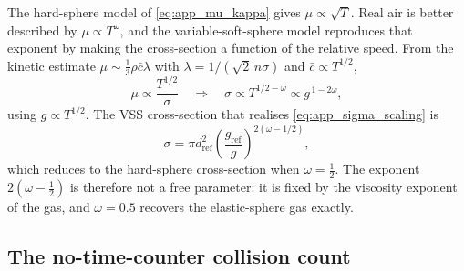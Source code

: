 The hard-sphere model of \eqref{eq:app_mu_kappa} gives $\mu\propto\sqrt{T}$. Real air is better described by $\mu\propto T^{\omega}$, and the variable-soft-sphere model reproduces that exponent by making the cross-section a function of the relative speed. From the kinetic estimate $\mu \sim \tfrac13\rho\bar{c}\lambda$ with $\lambda = 1/(\sqrt2\,n\sigma)$ and $\bar{c}\propto T^{1/2}$,
\begin{equation}
    \mu \propto \frac{T^{1/2}}{\sigma}
    \quad\Longrightarrow\quad
    \sigma \propto T^{1/2-\omega} \propto g^{\,1-2\omega} ,
    \label{eq:app_sigma_scaling}
\end{equation}
using $g \propto T^{1/2}$. The VSS cross-section that realises \eqref{eq:app_sigma_scaling} is~\cite{bird1981vss}
\begin{equation}
    \sigma = \pi d_{\mathrm{ref}}^2\left(\frac{g_{\mathrm{ref}}}{g}\right)^{2(\omega-1/2)} ,
    \label{eq:app_vss}
\end{equation}
which reduces to the hard-sphere cross-section when $\omega = \tfrac12$. The exponent $2(\omega-\tfrac12)$ is therefore not a free parameter: it is fixed by the viscosity exponent of the gas, and $\omega = 0.5$ recovers the elastic-sphere gas exactly.

\subsection{The no-time-counter collision count}
\label{app:ntc}

